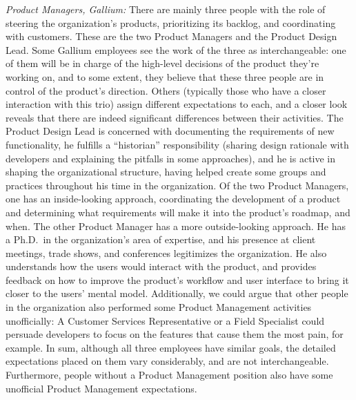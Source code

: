 \documentclass[10pt, conference, compsocconf]{IEEEtran}
\begin{document}
\emph{Product Managers, Gallium:} There are mainly three people with the role of steering the organization's products, prioritizing its backlog, and coordinating with customers. These are the two Product Managers and the Product Design Lead. Some Gallium employees see the work of the three as interchangeable: one of them will be in charge of the high-level decisions of the product they're working on, and to some extent, they believe that these three people are in control of the product's direction. Others (typically those who have a closer interaction with this trio) assign different expectations to each, and a closer look reveals that there are indeed significant differences between their activities. The Product Design Lead is concerned with documenting the requirements of new functionality, he fulfills a ``historian'' responsibility (sharing design rationale with developers and explaining the pitfalls in some approaches), and he is active in shaping the organizational structure, having helped create some groups and practices throughout his time in the organization. Of the two Product Managers, one has an inside-looking approach, coordinating the development of a product and determining what requirements will make it into the product's roadmap, and when. The other Product Manager has a more outside-looking approach. He has a Ph.D.\ in the organization's area of expertise, and his presence at client meetings, trade shows, and conferences legitimizes the organization. He also understands how the users would interact with the product, and provides feedback on how to improve the product's workflow and user interface to bring it closer to the users' mental model. Additionally, we could argue that other people in the organization also performed some Product Management activities unofficially: A Customer Services Representative or a Field Specialist could persuade developers to focus on the features that cause them the most pain, for example. In sum, although all three employees have similar goals, the detailed expectations placed on them vary considerably, and are not interchangeable. Furthermore, people without a Product Management position also have some unofficial Product Management expectations.
\end{document}
